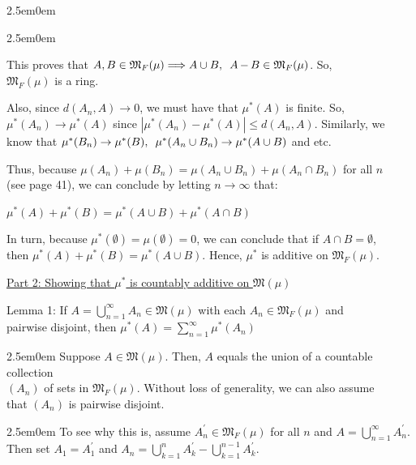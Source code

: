 \documentclass{book}
\newcommand{\hFour}{%
   \color{Cerulean}
   \fontsize{12}{14}\selectfont%
}
\newenvironment{myIndent}{%
   \begin{adjustwidth}{2.5em}{0em}%
}{%
   \end{adjustwidth}%
}
\newcommand{\myHS}{ \hspace{0.5em}}
\newcommand{\retTwo}{\hfill\bigbreak}
\begin{document}
{\begin{myIndent}
{\begin{myIndent}
      This proves that $A, B \in \mathfrak{M}_F(\mu) \Longrightarrow A \cup B, \myHS A \mathop{-} B \in \mathfrak{M}_F(\mu)$. So,\\ $\mathfrak{M}_F(\mu)$ is a ring.\retTwo
      
      \newpage

      Also, since $d(A_n, A) \rightarrow 0$, we must have that $\mu^*(A)$ is finite. So,\\ $\mu^*(A_n) \rightarrow \mu^*(A)$ since $|\mu^*(A_n) - \mu^*(A)| \leq d(A_n, A)$. Similarly, we\\ know that $\mu^*(B_n) \rightarrow \mu^*(B), \myHS\mu^*(A_n \cup B_n) \rightarrow \mu^*(A \cup B)$ and etc.\retTwo

     Thus, because $\mu(A_n) + \mu(B_n) = \mu(A_n \cup B_n) + \mu(A_n \cap B_n)$ for all $n$\\ (see page 41), we can conclude by letting $n \rightarrow \infty$ that:

     {\centering $\mu^*(A) + \mu^*(B) = \mu^*(A \cup B) + \mu^*(A \cap B)$ \retTwo\par}

      In turn, because $\mu^*(\emptyset) = \mu(\emptyset) = 0$, we can conclude that if $A \cap B = \emptyset$,\\ then $\mu^*(A) + \mu^*(B) = \mu^*(A \cup B)$. Hence, $\mu^*$ is additive on $\mathfrak{M}_F(\mu)$.\\ [8pt]

      {\centering \ul{Part 2: Showing that $\mu^*$ is countably additive on $\mathfrak{M}(\mu)$}\\[7pt]\par}

      Lemma 1: If $A = \bigcup\limits_{n=1}^\infty A_n \in \mathfrak{M}(\mu)$ with each $A_n \in \mathfrak{M}_F(\mu)$ and\\ [-14pt]\phantom{aaaaaaaaaaaaaaaaaaaaaaaaaaaa} pairwise disjoint, then $\mu^*(A) = \sum\limits_{n=1}^\infty \mu^*(A_n)$\\ [-4pt]
      
      {\begin{myIndent}\fontsize{12}{14}\selectfont
         Suppose $A \in \mathfrak{M}(\mu)$. Then, $A$ equals the union of a countable collection\\ $(A_n)$ of sets in $\mathfrak{M}_F(\mu)$. Without loss of generality, we can also assume\\ that $(A_n)$ is pairwise disjoint.
   
         {\begin{myIndent}\hFour\fontsize{11}{13}\selectfont
            To see why this is, assume $A_n^\prime \in \mathfrak{M}_F(\mu)$ for all $n$ and $A = \bigcup\limits_{n=1}^\infty A^\prime_n$.\\ [-9pt] Then set $A_1 = A_1^\prime$ and $A_n = \bigcup\limits_{k=1}^n A_k^\prime - \bigcup\limits_{k=1}^{n-1} A_k^\prime$.\\
   

\end{myIndent}}
\end{myIndent}}
\end{myIndent}}
\end{myIndent}}
\end{document}
